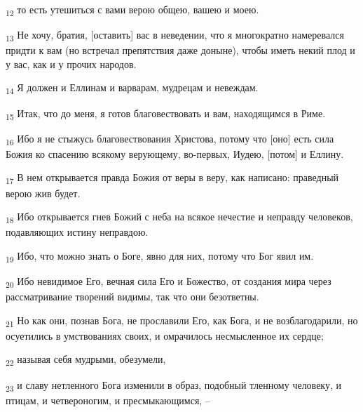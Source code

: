 \begin{tcolorbox}
\textsubscript{12} то есть утешиться с вами верою общею, вашею и моею.
\end{tcolorbox}
\begin{tcolorbox}
\textsubscript{13} Не хочу, братия, [оставить] вас в неведении, что я многократно намеревался придти к вам (но встречал препятствия даже доныне), чтобы иметь некий плод и у вас, как и у прочих народов.
\end{tcolorbox}
\begin{tcolorbox}
\textsubscript{14} Я должен и Еллинам и варварам, мудрецам и невеждам.
\end{tcolorbox}
\begin{tcolorbox}
\textsubscript{15} Итак, что до меня, я готов благовествовать и вам, находящимся в Риме.
\end{tcolorbox}
\begin{tcolorbox}
\textsubscript{16} Ибо я не стыжусь благовествования Христова, потому что [оно] есть сила Божия ко спасению всякому верующему, во-первых, Иудею, [потом] и Еллину.
\end{tcolorbox}
\begin{tcolorbox}
\textsubscript{17} В нем открывается правда Божия от веры в веру, как написано: праведный верою жив будет.
\end{tcolorbox}
\begin{tcolorbox}
\textsubscript{18} Ибо открывается гнев Божий с неба на всякое нечестие и неправду человеков, подавляющих истину неправдою.
\end{tcolorbox}
\begin{tcolorbox}
\textsubscript{19} Ибо, что можно знать о Боге, явно для них, потому что Бог явил им.
\end{tcolorbox}
\begin{tcolorbox}
\textsubscript{20} Ибо невидимое Его, вечная сила Его и Божество, от создания мира через рассматривание творений видимы, так что они безответны.
\end{tcolorbox}
\begin{tcolorbox}
\textsubscript{21} Но как они, познав Бога, не прославили Его, как Бога, и не возблагодарили, но осуетились в умствованиях своих, и омрачилось несмысленное их сердце;
\end{tcolorbox}
\begin{tcolorbox}
\textsubscript{22} называя себя мудрыми, обезумели,
\end{tcolorbox}
\begin{tcolorbox}
\textsubscript{23} и славу нетленного Бога изменили в образ, подобный тленному человеку, и птицам, и четвероногим, и пресмыкающимся, --
\end{tcolorbox}
